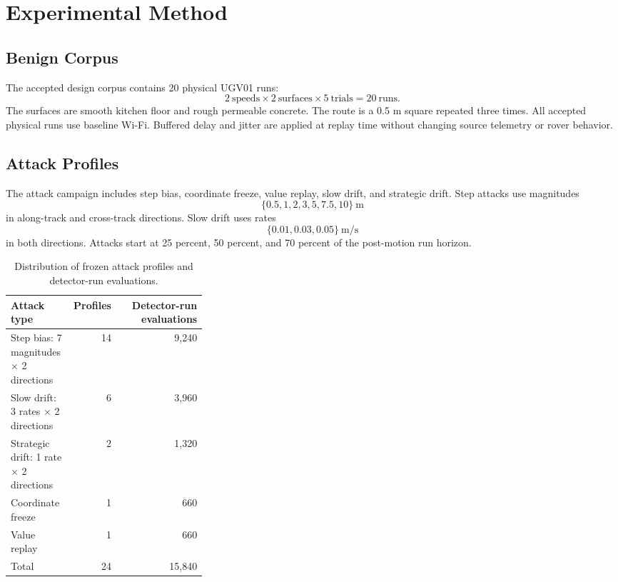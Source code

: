\documentclass[conference]{IEEEtran}
\begin{document}
\section{Experimental Method}
\label{sec:method}

\subsection{Benign Corpus}

The accepted design corpus contains 20 physical UGV01 runs:
\begin{equation}
2\ \text{speeds} \times 2\ \text{surfaces} \times 5\ \text{trials}
= 20\ \text{runs}.
\end{equation}
The surfaces are smooth kitchen floor and rough permeable concrete. The route
is a 0.5 m square repeated three times. All accepted physical runs use baseline
Wi-Fi. Buffered delay and jitter are applied at replay time without changing
source telemetry or rover behavior.

\subsection{Attack Profiles}

The attack campaign includes step bias, coordinate freeze, value replay, slow
drift, and strategic drift. Step attacks use magnitudes
\[
\{0.5,1,2,3,5,7.5,10\}\ \mathrm{m}
\]
in along-track and cross-track directions. Slow drift uses rates
\[
\{0.01,0.03,0.05\}\ \mathrm{m/s}
\]
in both directions. Attacks start at 25 percent, 50 percent, and 70 percent of
the post-motion run horizon.

\begin{table}[t]
\centering
\caption{Distribution of frozen attack profiles and detector-run evaluations.}
\label{tab:attack_distribution}
\scriptsize
\begin{tabular}{L{0.32\linewidth} r r}
\toprule
\textbf{Attack type} & \textbf{Profiles} & \textbf{Detector-run evaluations} \\
\midrule
Step bias: 7 magnitudes $\times$ 2 directions & 14 & 9,240 \\
Slow drift: 3 rates $\times$ 2 directions & 6 & 3,960 \\
Strategic drift: 1 rate $\times$ 2 directions & 2 & 1,320 \\
Coordinate freeze & 1 & 660 \\
Value replay & 1 & 660 \\
\midrule
Total & 24 & 15,840 \\
\bottomrule
\end{tabular}
\end{table}
\end{document}
